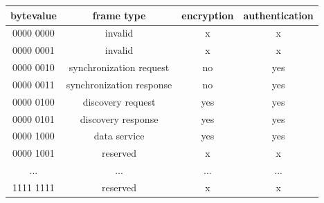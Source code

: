 \begin{center}
\begin{tabular}{ c | c | c | c}
 \label{table:secHeader}
   bytevalue & frame type & encryption & authentication \\ \hline
   0000 0000 & invalid & x & x \\
   0000 0001 & invalid & x & x \\
   0000 0010 & synchronization request & no & yes \\
   0000 0011 & synchronization response & no & yes \\
   0000 0100 & discovery request & yes & yes \\
   0000 0101 & discovery response & yes & yes \\
   0000 1000 & data service & yes & yes \\
   0000 1001 & reserved & x & x \\
   ...  & ...  & ... & ... \\
   1111 1111 & reserved & x & x \\
\end{tabular}
\end{center}

